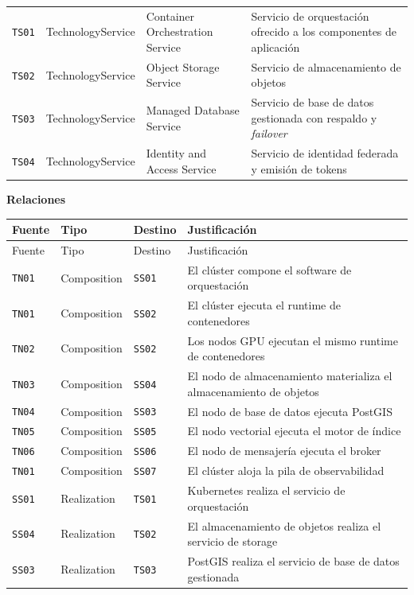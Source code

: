 \documentclass{article}
\newcommand{\mdhfour}[1]{\par\medskip\noindent\textbf{#1}\par\nobreak\smallskip}
\begin{document}
{\begin{longtable}{@{}L{0.40in}L{1.27in}L{1.36in}L{2.90in}@{}}
\texttt{TS01} & TechnologyService & Container Orchestration Service & Servicio de orquestación ofrecido a los componentes de aplicación \\
\texttt{TS02} & TechnologyService & Object Storage Service & Servicio de almacenamiento de objetos \\
\texttt{TS03} & TechnologyService & Managed Database Service & Servicio de base de datos gestionada con respaldo y \emph{failover} \\
\texttt{TS04} & TechnologyService & Identity and Access Service & Servicio de identidad federada y emisión de tokens \\
\end{longtable}
}

\mdhfour{Relaciones}

{\small
\begin{longtable}{@{}L{0.45in}L{0.86in}L{0.53in}L{4.11in}@{}}
\toprule
Fuente & Tipo & Destino & Justificación \\
\midrule
\endfirsthead
\toprule
Fuente & Tipo & Destino & Justificación \\
\midrule
\endhead
\bottomrule
\endlastfoot
\texttt{TN01} & Composition & \texttt{SS01} & El clúster compone el software de orquestación \\
\texttt{TN01} & Composition & \texttt{SS02} & El clúster ejecuta el runtime de contenedores \\
\texttt{TN02} & Composition & \texttt{SS02} & Los nodos GPU ejecutan el mismo runtime de contenedores \\
\texttt{TN03} & Composition & \texttt{SS04} & El nodo de almacenamiento materializa el almacenamiento de objetos \\
\texttt{TN04} & Composition & \texttt{SS03} & El nodo de base de datos ejecuta PostGIS \\
\texttt{TN05} & Composition & \texttt{SS05} & El nodo vectorial ejecuta el motor de índice \\
\texttt{TN06} & Composition & \texttt{SS06} & El nodo de mensajería ejecuta el broker \\
\texttt{TN01} & Composition & \texttt{SS07} & El clúster aloja la pila de observabilidad \\
\texttt{SS01} & Realization & \texttt{TS01} & Kubernetes realiza el servicio de orquestación \\
\texttt{SS04} & Realization & \texttt{TS02} & El almacenamiento de objetos realiza el servicio de storage \\
\texttt{SS03} & Realization & \texttt{TS03} & PostGIS realiza el servicio de base de datos gestionada \\

\end{longtable}}
\end{document}
